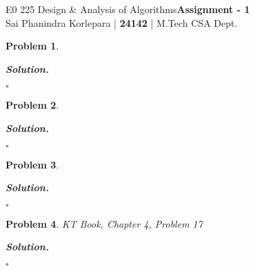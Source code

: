 \documentclass[12pt]{article}
\newtheorem{problem}{Problem}
\newenvironment{solution}[1][\it{Solution}]{\textbf{#1. } }{$\square$}
\begin{document}
\noindent E0 225 Design \& Analysis of Algorithms\hfill \textbf{Assignment - 1}\\
Sai Phanindra Korlepara | \textbf{24142} | M.Tech CSA Dept.

\hrulefill %

\begin{problem}

\end{problem}


\begin{solution}

\end{solution} 

\hrulefill %

\begin{problem}

\end{problem}


\begin{solution}

\end{solution}

\hrulefill %

\begin{problem}

\end{problem}


\begin{solution}

\end{solution}

\hrulefill %

\begin{problem}
KT Book, Chapter 4, Problem 17

\end{problem}


\begin{solution}

\end{solution}

\hrulefill %
\end{document}
